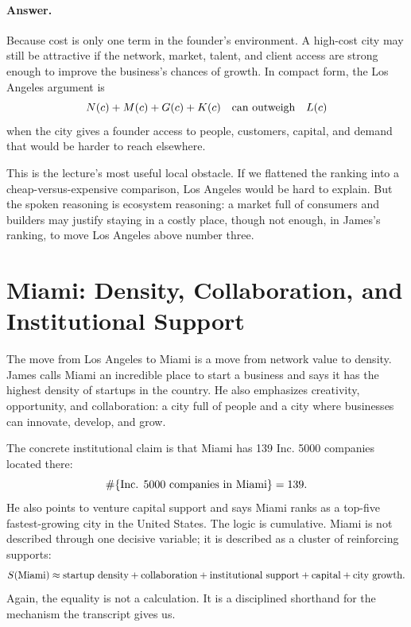 \paragraph{Answer.}
Because cost is only one term in the founder's environment. A high-cost city may still be attractive if the network, market, talent, and client access are strong enough to improve the business's chances of growth. In compact form, the Los Angeles argument is
\begin{equation}
N(c)+M(c)+G(c)+K(c)
\quad \hbox{can outweigh} \quad
L(c)
\end{equation}
when the city gives a founder access to people, customers, capital, and demand that would be harder to reach elsewhere.

This is the lecture's most useful local obstacle. If we flattened the ranking into a cheap-versus-expensive comparison, Los Angeles would be hard to explain. But the spoken reasoning is ecosystem reasoning: a market full of consumers and builders may justify staying in a costly place, though not enough, in James's ranking, to move Los Angeles above number three.

\section{Miami: Density, Collaboration, and Institutional Support}

The move from Los Angeles to Miami is a move from network value to density. James calls Miami an incredible place to start a business and says it has the highest density of startups in the country. He also emphasizes creativity, opportunity, and collaboration: a city full of people and a city where businesses can innovate, develop, and grow.

The concrete institutional claim is that Miami has 139 Inc. 5000 companies located there:
\begin{equation}
\#\{\hbox{Inc. 5000 companies in Miami}\}=139.
\end{equation}
He also points to venture capital support and says Miami ranks as a top-five fastest-growing city in the United States. The logic is cumulative. Miami is not described through one decisive variable; it is described as a cluster of reinforcing supports:
\begin{equation}
S(\text{Miami})
\approx
\hbox{startup density}
+\hbox{collaboration}
+\hbox{institutional support}
+\hbox{capital}
+\hbox{city growth}.
\end{equation}
Again, the equality is not a calculation. It is a disciplined shorthand for the mechanism the transcript gives us.

